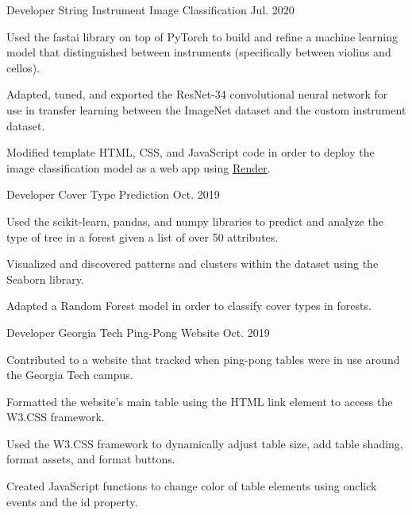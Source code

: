 \begin{cventries}

\cvproject
{Developer} %
{String Instrument Image Classification} %
{} %
{Jul. 2020} %
{ %
\begin{cvitems}
\item {
Used the fastai library on top of PyTorch to build and refine a machine learning model that distinguished between instruments (specifically between violins and cellos).}
\item {
Adapted, tuned, and exported the ResNet-34 convolutional neural network for use in transfer learning between the ImageNet dataset and the custom instrument dataset.
}
\item {
Modified template HTML, CSS, and JavaScript code in order to deploy the image classification model as a web app using \href{https://render.com}{Render}.
}
\end{cvitems}
}

\cvproject
{Developer} %
{Cover Type Prediction} %
{} %
{Oct. 2019} %
{ %
\begin{cvitems}
\item {Used the scikit-learn, pandas, and numpy libraries to predict and analyze the type of tree in a forest given a list of over 50 attributes.}
\item {Visualized and discovered patterns and clusters within the dataset using the Seaborn library.}
\item {Adapted a Random Forest model in order to classify cover types in forests.
}
\end{cvitems}
}

\cvproject
{Developer} %
{Georgia Tech Ping-Pong Website} %
{} %
{Oct. 2019} %
{ %
\begin{cvitems}
\item {Contributed to a website that tracked when ping-pong tables were in use around the Georgia Tech campus.}
\item {Formatted the website's main table using the HTML link element to access the W3.CSS framework.}
\item {Used the W3.CSS framework to dynamically adjust table size, add table shading, format assets, and format buttons.}
\item {Created JavaScript functions to change color of table elements using onclick events and the id property.}
\end{cvitems}
}


\end{cventries}
